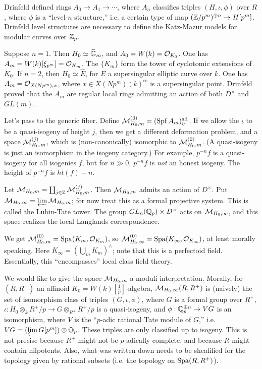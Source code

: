 \documentclass{article}
\begin{document}
Drinfeld defined rings $A_0 \to A_1 \to \cdots$, where $A_n$ classifies 
triples $(H,\iota,\phi)$ over $R$, where 
$\phi$ is a ``level-$n$ structure,'' i.e. a certain type of map 
$(\mathbb{Z}/p^m)^{\oplus n} \to H[p^m]$. Drinfeld level structures are necessary to 
define the Katz-Mazur models for modular curves over $\mathbb{Z}_p$. 

Suppose $n=1$. Then $H_0\simeq \widehat{\mathbb{G}}_m$, and $A_0=W(k) = \mathcal{O}_{K_0}$. 
One has $A_m = W(k)[\xi_{p^m}] = \mathcal{O}_{K_m}$. The $\{K_m\}$ form the tower 
of cyclotomic extensions of $K_0$. If $n=2$, then $H_0\simeq \widehat E$, for 
$E$ a supersingular elliptic curve over $k$. One has 
$A_m=\mathcal{O}_{X(N p^m),x}$, where $x\in X(N p^m)(k)^\text{ss}$ is a supersingular 
point. Drinfeld proved that the $A_m$ are regular local rings admitting an 
action of both $D^\times$ and $GL(m)$. 

Let's pass to the generic fiber. Define $\mathcal{M}_{H_0,m}^{(0)}= (\operatorname{Spf} A_m)_\eta^{\textnormal{ad}}$. 
If we allow the $\iota$ to be a quasi-isogeny of height $j$, then we get a 
different deformation problem, and a space $\mathcal{M}_{H_0,m}^{(j)}$, which is 
(non-canonically) isomorphic to $\mathcal{M}_{H_0,m}^{(0)}$. (A quasi-isogeny is 
just an isomorphism in the isogeny category.) For example, 
$p^{-n} f$ is a quasi-isogeny for all isogenies $f$, but for $n\gg 0$, 
$p^{-n} f$ is \emph{not} an honest isogeny. The height of 
$p^{-n} f$ is $ht(f)-n$. 

Let $\mathcal{M}_{H_0,m} = \coprod_{j\in \mathbb{Z}} \mathcal{M}_{H_0,m}^{(j)}$. Then $\mathcal{M}_{H_0,m}$ admits an action of 
$D^\times$. Put $\mathcal{M}_{H_0,\infty} = \varprojlim \mathcal{M}_{H_0,m}$; for now treat 
this as a formal projective system. This is called the Lubin-Tate tower. The 
group $GL_n(\mathbb{Q}_p)\times D^\times$ acts on $\mathcal{M}_{H_0,\infty}$, and this space 
realizes the local Langlands correspondence. 

\begin{example}[$n=1$]
We get $\mathcal{M}_{H_0,m}^{(0)} = \operatorname{Spa}(K_m,\mathcal{O}_{K_m})$, so 
$\mathcal{M}_{H_0,\infty}^{(0)} = \operatorname{Spa}(K_\infty,\mathcal{O}_{K_\infty})$, at least morally 
speaking. Here $K_\infty =(\bigcup_m K_m)^\wedge$; note that this is a perfectoid 
field. Essentially, this ``encompasses'' local class field theory. 
\end{example}

We would like to give the space $\mathcal{M}_{H_0,m}$ a moduli interpretation. Morally, 
for $(R,R^+)$ an affinoid $K_0=W(k)[\frac 1 p]$-algebra, $\mathcal{M}_{H_0,\infty}(R,R^+)$ is 
(naively) the set of isomorphism class of triples $(G,\iota,\phi)$, where 
$G$ is a formal group over $R^+$, $\iota:H_0 \otimes_k R^+/p \to G\otimes_{R^+} R^+/p$ 
is a quasi-isogeny, and $\phi:\mathbb{Q}_p^{\oplus n}\to V G$ is an isomorphism, where 
$V$ is the ``$p$-adic rational Tate module of $G$,'' i.e. 
$V G=(\varprojlim G[p^m])\otimes \mathbb{Q}_p$. These triples are only classified up to 
isogeny. This is not precise because $R^+$ might not be $p$-adically complete, and 
because $R$ might contain nilpotents. Also, what was written down needs to be 
sheafified for the topology given by rational subsets (i.e. the topology on 
$\operatorname{Spa}(R,R^+)$). 
\end{document}
